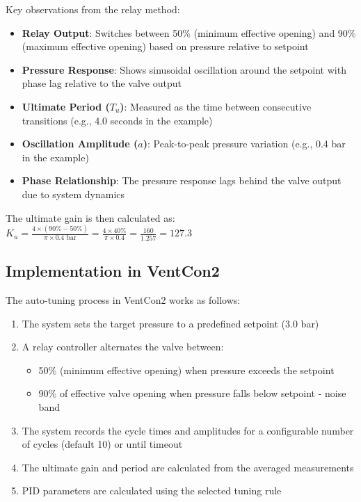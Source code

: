 \documentclass[a4paper,11pt]{article}
\begin{document}
Key observations from the relay method:

\begin{itemize}
    \item \textbf{Relay Output}: Switches between 50\% (minimum effective opening) and 90\% (maximum effective opening) based on pressure relative to setpoint
    \item \textbf{Pressure Response}: Shows sinusoidal oscillation around the setpoint with phase lag relative to the valve output
    \item \textbf{Ultimate Period ($T_u$)}: Measured as the time between consecutive transitions (e.g., 4.0 seconds in the example)
    \item \textbf{Oscillation Amplitude ($a$)}: Peak-to-peak pressure variation (e.g., 0.4 bar in the example)
    \item \textbf{Phase Relationship}: The pressure response lags behind the valve output due to system dynamics
\end{itemize}

The ultimate gain is then calculated as: $K_u = \frac{4 \times (90\% - 50\%)}{\pi \times 0.4 \text{ bar}} = \frac{4 \times 40\%}{\pi \times 0.4} = \frac{160}{1.257} = 127.3$

\subsection{Implementation in VentCon2}

The auto-tuning process in VentCon2 works as follows:

\begin{enumerate}
    \item The system sets the target pressure to a predefined setpoint (3.0 bar)
    \item A relay controller alternates the valve between:
    \begin{itemize}
        \item 50\% (minimum effective opening) when pressure exceeds the setpoint
        \item 90\% of effective valve opening when pressure falls below setpoint - noise band
    \end{itemize}
    \item The system records the cycle times and amplitudes for a configurable number of cycles (default 10) or until timeout
    \item The ultimate gain and period are calculated from the averaged measurements
    \item PID parameters are calculated using the selected tuning rule
\end{enumerate}
\end{document}
